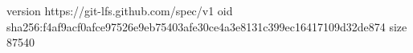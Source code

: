 version https://git-lfs.github.com/spec/v1
oid sha256:f4af9acf0afce97526e9eb75403afe30ce4a3e8131c399ec16417109d32de874
size 87540
